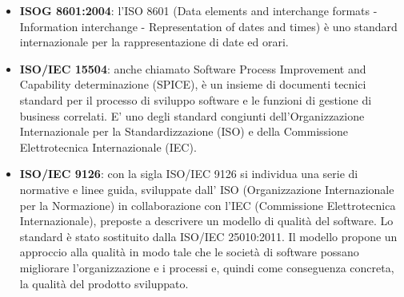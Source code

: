 \begin{itemize}
	\item
	\textbf{ISOG 8601:2004}: l'ISO 8601 (Data elements and interchange formats - Information interchange - Representation of dates and times) è uno standard internazionale per la rappresentazione di date ed orari.
	\item
	\textbf{ISO/IEC 15504}: anche chiamato Software Process Improvement and Capability determinazione (SPICE), è un insieme di documenti tecnici standard per il processo di sviluppo software e le funzioni di gestione di business correlati. E' uno degli standard congiunti dell'Organizzazione Internazionale per la Standardizzazione (ISO) e della Commissione Elettrotecnica Internazionale (IEC).
	\item
	\textbf{ISO/IEC 9126}: con la sigla ISO/IEC 9126 si individua una serie di normative e linee guida, sviluppate dall’ ISO (Organizzazione Internazionale per la Normazione) in collaborazione con l'IEC (Commissione Elettrotecnica Internazionale), preposte a descrivere un modello di qualità del software. Lo standard è stato sostituito dalla ISO/IEC 25010:2011. Il modello propone un approccio alla qualità in modo tale che le società di software possano migliorare l'organizzazione e i processi e, quindi come conseguenza concreta, la qualità del prodotto sviluppato.
\end{itemize}